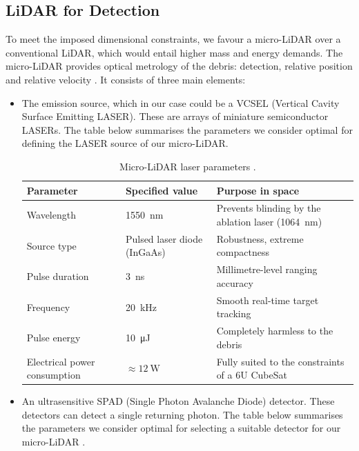 \documentclass[11pt,a4paper]{article}
\begin{document}
\subsection{LiDAR for Detection}
To meet the imposed dimensional constraints, we favour a micro-LiDAR over a conventional LiDAR, which would entail higher mass and energy demands. The micro-LiDAR provides optical metrology of the debris: detection, relative position and relative velocity \cite{OpromollaNocerino}. It consists of three main elements:
\begin{itemize}
    \item The emission source, which in our case could be a VCSEL (Vertical Cavity Surface Emitting LASER). These are arrays of miniature semiconductor LASERs. The table below summarises the parameters we consider optimal for defining the LASER source of our micro-LiDAR.

    \begin{table}[H]
      \centering
      \small
      \caption{Micro-LiDAR laser parameters \cite{VCSEL1550_2023}.}
      \label{tab:lidar_laser}
      \begin{tabular}{p{3.3cm} p{4.7cm} p{6.5cm}}
        \toprule
        \textbf{Parameter} & \textbf{Specified value} & \textbf{Purpose in space} \\
        \midrule
        Wavelength & \SI{1550}{\nano\metre} & Prevents blinding by the ablation laser (\SI{1064}{\nano\metre}) \\
        Source type & Pulsed laser diode (InGaAs) & Robustness, extreme compactness \\
        Pulse duration & \SI{3}{\nano\second} & Millimetre-level ranging accuracy \\
        Frequency & \SI{20}{\kilo\hertz} & Smooth real-time target tracking \\
        Pulse energy & \SI{10}{\micro\joule} & Completely harmless to the debris \\
        Electrical power consumption & $\approx\SI{12}{\watt}$ & Fully suited to the constraints of a 6U CubeSat \\
        \bottomrule
      \end{tabular}
    \end{table}

    \item An ultrasensitive SPAD (Single Photon Avalanche Diode) detector. These detectors can detect a single returning photon. The table below summarises the parameters we consider optimal for selecting a suitable detector for our micro-LiDAR \cite{Pellegrini2006}.


\end{itemize}
\end{document}
